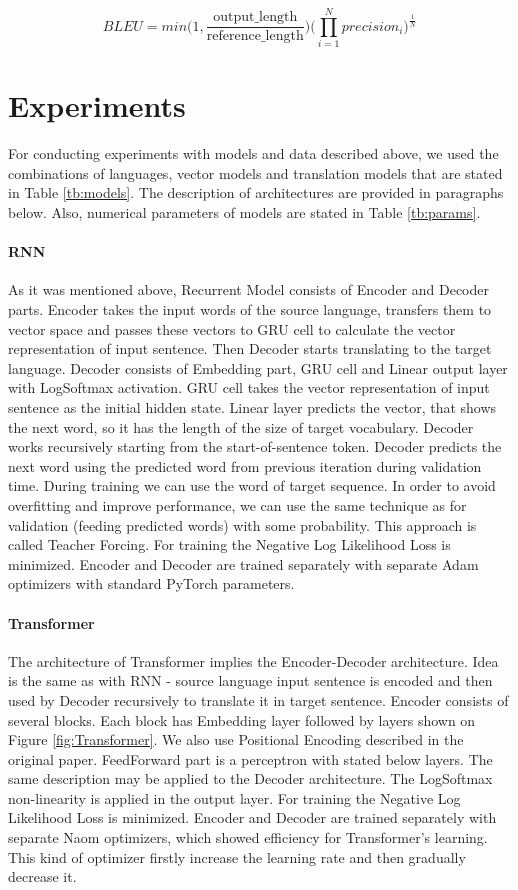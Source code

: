 \documentclass{article}
\begin{document}
\begin{equation}
BLEU = min \Big( 1, \frac{\text{output\_length}}{\text{reference\_length}}
\Big)
\big(
\prod_{i=1}^{N} precision_{i}
\big)^{\frac{1}{N}}
\end{equation}

\section*{Experiments}

For conducting experiments with models and data described above, we used the combinations of languages, vector models and translation models that are stated in Table \ref{tb:models}. The description of architectures are provided in paragraphs below. Also, numerical parameters of models are stated in Table \ref{tb:params}.

\paragraph{RNN} As it was mentioned above, Recurrent Model consists of Encoder and Decoder parts. Encoder takes the input words of the source language, transfers them to vector space and passes these vectors to GRU cell to calculate the vector representation of input sentence. Then Decoder starts translating to the target language. Decoder consists of Embedding part, GRU cell and Linear output layer with LogSoftmax activation. GRU cell takes the vector representation of input sentence as the initial hidden state. Linear layer predicts the vector, that shows the next word, so it has the length of the size of target vocabulary. Decoder works recursively starting from the start-of-sentence token. Decoder predicts the next word using the predicted word from previous iteration during validation time. During training we can use the word of target sequence. In order to avoid overfitting and improve performance, we can use the same technique as for validation (feeding predicted words) with some probability. This approach is called Teacher Forcing. For training the Negative Log Likelihood Loss is minimized. Encoder and Decoder are trained separately with separate Adam optimizers with standard PyTorch parameters.

\paragraph{Transformer} The architecture of Transformer implies the Encoder-Decoder architecture. Idea is the same as with RNN - source language input sentence is encoded and then used by Decoder recursively to translate it in target sentence. Encoder consists of several blocks. Each block has Embedding layer followed by layers shown on Figure \ref{fig:Transformer}. We also use Positional Encoding described in the original paper. FeedForward part is a perceptron with stated below layers. The same description may be applied to the Decoder architecture. The LogSoftmax non-linearity is applied in the output layer. For training the Negative Log Likelihood Loss is minimized. Encoder and Decoder are trained separately with separate Naom optimizers, which showed efficiency for Transformer's learning. This kind of optimizer firstly increase the learning rate and then gradually decrease it.
\end{document}
